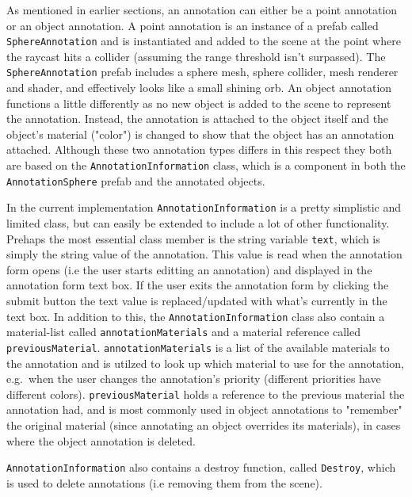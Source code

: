 As mentioned in earlier sections, an annotation can either be a point annotation or an object annotation. A point annotation is an instance of a prefab 
called \texttt{SphereAnnotation} and is instantiated and added to the scene at the point where the raycast hits a collider (assuming the range threshold isn't surpassed).  
The \texttt{SphereAnnotation} prefab includes a sphere mesh, sphere collider, mesh renderer and shader, and effectively looks like a small shining orb.
An object annotation functions a little differently as no new object is added to the scene to represent the annotation. Instead, the annotation is attached to the 
object itself and the object's material ("color") is changed to show that the object has an annotation attached. Although these two annotation types differs in this respect 
they both are based on the \texttt{AnnotationInformation} class, which is a component in both the \texttt{AnnotationSphere} prefab and the annotated objects. 

In the current implementation \texttt{AnnotationInformation} is a pretty simplistic and limited class, but can easily be extended to include a lot of other functionality. 
Prehaps the most essential class member is the string variable \texttt{text}, which is simply the string value of the annotation.
This value is read when the annotation form opens (i.e the user starts editting an annotation) and displayed in the annotation form text box. 
If the user exits the annotation form by clicking the submit button the text value is replaced/updated with what's currently in the text box. 
In addition to this, the \texttt{AnnotationInformation} class also contain a material-list called \texttt{annotationMaterials} and a material reference called
\texttt{previousMaterial}. \texttt{annotationMaterials} is a list of the available materials to the annotation and is utilzed to look up which material to use for the annotation, 
e.g.~when the user changes the annotation's priority (different priorities have different colors). 
\texttt{previousMaterial} holds a reference to the previous material the annotation had, and is most commonly used in object annotations to "remember" the original material 
(since annotating an object overrides its materials), in cases where the object annotation is deleted.  

\texttt{AnnotationInformation} also contains a destroy function, called \texttt{Destroy}, which is used to delete annotations (i.e removing them from the scene).


